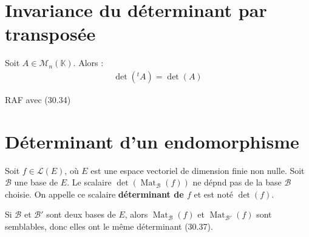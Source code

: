 \documentclass[../main.tex]{subfiles}
\begin{document}
\section{Invariance du déterminant par transposée}
\begin{tcolorbox}[title=Théorème 30.41, title filled=false, colframe=orange, colback=orange!10!white]
    Soit $A\in \mathcal{M}_n(\mathbb{K})$. Alors :
    \begin{align*}
        \operatorname{det}(^tA) = \operatorname{det}(A)
    \end{align*}
\end{tcolorbox}

\noindent RAF avec (30.34)

\section{Déterminant d'un endomorphisme}
\begin{tcolorbox}[title=Théorème 30.42, title filled=false, colframe=orange, colback=orange!10!white]
    Soit $f\in \mathcal{L}(E)$, où $E$ est une espace vectoriel de dimension finie non nulle. Soit $\mathcal{B}$ une base de $E$. Le scalaire $\operatorname{det}(\operatorname{Mat}_{\mathcal{B}}(f))$ ne dépnd pas de la base $\mathcal{B}$ choisie. On appelle ce scalaire \textbf{déterminant de $f$} et est noté $\operatorname{det}(f)$. 
\end{tcolorbox}

\noindent Si $\mathcal{B}$ et $\mathcal{B}'$ sont deux bases de $E$, alors $\operatorname{Mat}_{\mathcal{B}}(f)$ et $\operatorname{Mat}_{\mathcal{B}'}(f)$ sont semblables, donc elles ont le même déterminant (30.37). 
\end{document}
